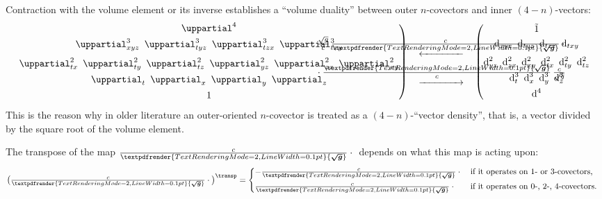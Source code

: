 \documentclass[\ifafour a4paper,12pt,\else a5paper,10pt,\fi%
onecolumn,oneside,article,%
british%
]{memoir}
\theoremstyle{remark}
\theoremstyle{innote}
\renewcommand*{\bm}[1]{\textpdfrender{TextRenderingMode=2,LineWidth=0.1pt}{\boldsymbol{#1}}}
\newcommand*{\de}{\uppartial}%
\newcommand*{\di}{\mathrm{d}}%
\renewcommand*{\|}[1][]{\nonscript\:#1\vert\nonscript\:\mathopen{}}
\newcommand*{\T}{^\transp}%
\newcommand*{\se}[1]{\de_{#1}}
\newcommand*{\sse}[1]{\de^{2}_{#1}}
\newcommand*{\ssse}[1]{\de^{3}_{#1}}
\newcommand*{\sssse}[1]{\de^{4}_{#1}}
\newcommand*{\tw}[1]{\tilde{#1}}
\newcommand*{\ti}[1]{\di_{#1}}
\newcommand*{\tti}[1]{\di^{2}_{#1}}
\newcommand*{\ttti}[1]{\di^{3}_{#1}}
\newcommand*{\tttti}[1]{\di^{4}_{#1}}
\newcommand*{\dg}{\sqrt{g}}
\newcommand*{\ve}{\tfrac{\bm{\sqrt{g}}}{c}}
\newcommand*{\vi}{\tfrac{c}{\bm{\sqrt{g}}}}
\begin{document}
Contraction with the volume element or its inverse establishes a \enquote{volume duality} between outer $n$-covectors and inner $(4-n)$-vectors:
\begin{equation}
  \label{eq:volume_duality}
  \left.
    \begin{gathered}
      \sssse{}
      \\
  \ssse{xyz}\enspace
  \ssse{tyz}\enspace
  \ssse{tzx}\enspace
  \ssse{txy}
  \\[\jot]
  \sse{tx}\enspace
  \sse{ty}\enspace
  \sse{tz}\enspace
  \sse{yz}\enspace
  \sse{zx}\enspace
  \sse{xy}
  \\
  \se{t}\enspace
  \se{x}\enspace
  \se{y}\enspace
  \se{z}
  \\
  1
\end{gathered}
\right)\quad
\begin{gathered}
  \xleftarrow{\qquad\mathclap{\textstyle\frac{\dg}{c}\,\vi\cdot{}}\qquad}
  \\
  \xrightarrow{\qquad\mathclap{\textstyle{}\cdot\ve\,\frac{c}{\dg}}\qquad}
\end{gathered}
\quad%
\left(
  \begin{gathered}
    \tw{1}
    \\
  \ti{xyz}\enspace
  \ti{tyz}\enspace
  \ti{tzx}\enspace
  \ti{txy}
  \\[\jot]
  \tti{yz}\enspace
  \tti{zx}\enspace
  \tti{xy}\enspace
  \tti{tx}\enspace
  \tti{ty}\enspace
  \tti{tz}
  \\
  \ttti{t}\enspace
  \ttti{x}\enspace
  \ttti{y}\enspace
  \ttti{z}
  \\
  \tttti{}
\end{gathered}
\right.
\end{equation}
This is the reason why in older literature an outer-oriented $n$-covector is treated as a $(4-n)$-\enquote{vector density}, that is, a vector divided by the square root of the volume element.

The transpose of the map $\vi\cdot{}$ depends on what this map is acting upon:
\begin{equation}
  \label{eq:transpose_inv_vol_element}
  \bigl(\vi\cdot{}\bigr)\T =
  \begin{dcases*}
    -\vi\cdot{}& if it operates on 1- or 3-covectors,
    \\
    \vi\cdot{}& if it operates on 0-, 2-, 4-covectors.
  \end{dcases*}
\end{equation}


\medskip
\end{document}
